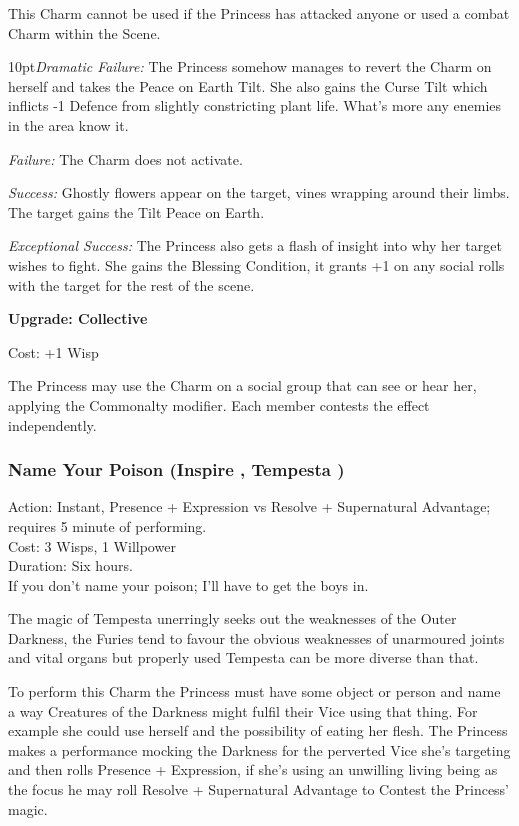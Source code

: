 This Charm cannot be used if the Princess has attacked anyone or used a combat Charm within the Scene.

   \begin{myindentpar}{10pt}\emph{Dramatic Failure:} The Princess somehow manages to revert the Charm on herself and takes the Peace on Earth Tilt. She also gains the Curse Tilt which inflicts -1 Defence from slightly constricting plant life. What's more any enemies in the area know it.

    \emph{Failure:} The Charm does not activate.

    \emph{Success:} Ghostly flowers appear on the target, vines wrapping around their limbs. The target gains the Tilt Peace on Earth. 

    \emph{Exceptional Success:} The Princess also gets a flash of insight into why her target wishes to fight. She gains the Blessing Condition, it grants +1 on any social rolls with the target for the rest of the scene.

\textbf{Upgrade: Collective}

\noindent Cost: +1 Wisp

The Princess may use the Charm on a social group that can see or hear her, applying the Commonalty modifier. Each member contests the effect independently.\end{myindentpar}

\subsubsection*{Name Your Poison (Inspire \textbullet\textbullet\textbullet, Tempesta \textbullet\textbullet\textbullet)}

\noindent Action: Instant, Presence + Expression vs Resolve + Supernatural Advantage; requires 5 minute of performing. \\

\noindent Cost: 3 Wisps, 1 Willpower\\

\noindent Duration: Six hours.\\

If you don't name your poison; I'll have to get the boys in.

The magic of Tempesta unerringly seeks out the weaknesses of the Outer Darkness, the Furies tend to favour the obvious weaknesses of unarmoured joints and vital organs but properly used Tempesta can be more diverse than that.

To perform this Charm the Princess must have some object or person and name a way Creatures of the Darkness might fulfil their Vice using that thing. For example she could use herself and the possibility of eating her flesh. The Princess makes a performance mocking the Darkness for the perverted Vice she's targeting and then rolls Presence + Expression, if she's using an unwilling living being as the focus he may roll Resolve + Supernatural Advantage to Contest the Princess' magic.

